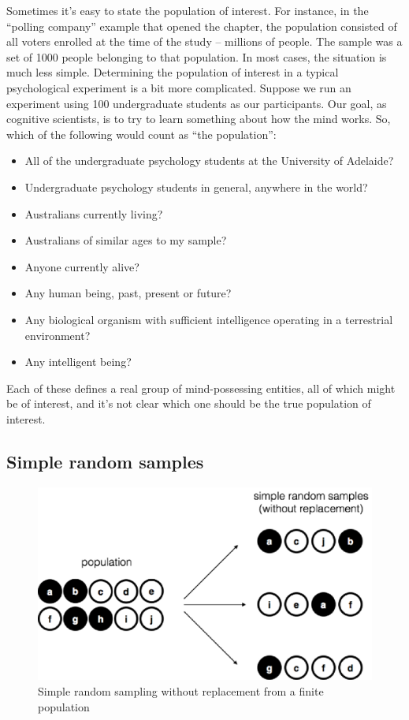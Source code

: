 \documentclass[
  11pt,
  a4paper,
  twoside,symmetric,openright]{book}
\providecommand{\tightlist}{%
  \setlength{\itemsep}{0pt}\setlength{\parskip}{0pt}}
\theoremstyle{break}
\theoremstyle{break}
\begin{document}
Sometimes it's easy to state the population of interest. For instance, in the ``polling company'' example that opened the chapter, the population consisted of all voters enrolled at the time of the study -- millions of people. The sample was a set of 1000 people belonging to that population. In most cases, the situation is much less simple. Determining the population of interest in a typical psychological experiment is a bit more complicated. Suppose we run an experiment using 100 undergraduate students as our participants. Our goal, as cognitive scientists, is to try to learn something about how the mind works. So, which of the following would count as ``the population'':

\begin{itemize}
\tightlist
\item
  All of the undergraduate psychology students at the University of Adelaide?
\item
  Undergraduate psychology students in general, anywhere in the world?
\item
  Australians currently living?
\item
  Australians of similar ages to my sample?
\item
  Anyone currently alive?
\item
  Any human being, past, present or future?
\item
  Any biological organism with sufficient intelligence operating in a terrestrial environment?
\item
  Any intelligent being?
\end{itemize}

Each of these defines a real group of mind-possessing entities, all of which might be of interest, and it's not clear which one should be the true population of interest.

\subsection{Simple random samples}\label{simple-random-samples}

\begin{figure}

{\centering \includegraphics[width=0.6\linewidth]{resources/image/srs1} 

}

\caption{Simple random sampling without replacement from a finite population}\label{fig:srs1}
\end{figure}
\end{document}
